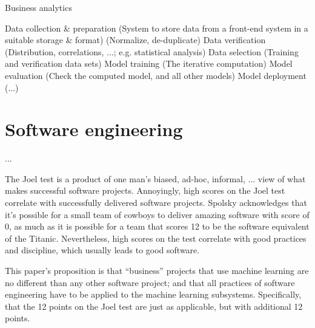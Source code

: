 Business analytics

Data collection \& preparation
  (System to store data from a front-end system in a suitable storage \& format)
  (Normalize, de-duplicate)
Data verification 
  (Distribution, correlations, ...; e.g. statistical analysis)
Data selection
  (Training and verification data sets)
Model training
  (The iterative computation)
Model evaluation
  (Check the computed model, and all other models)
Model deployment
  (...)

\section{Software engineering}
...

The Joel test\cite{joeltest} is a product of one man's biased, ad-hoc, informal, ... view of what makes successful software projects. Annoyingly, high scores on the Joel test correlate with successfully delivered software projects. Spolsky acknowledges that it's possible for a small team of cowboys to deliver amazing software with score of 0, as much as it is possible for a team that scores 12 to be the software equivalent of the Titanic. Nevertheless, high scores on the test correlate with good practices and discipline, which usually leads to good software.

This paper's proposition is that ``business'' projects that use machine learning are no different than any other software project; and that all practices of software engineering have to be applied to the machine learning subsystems. Specifically, that the 12 points on the Joel test are just as applicable, but with additional 12 points. 


